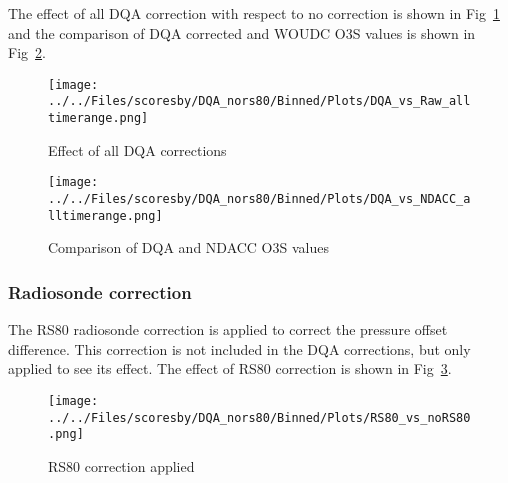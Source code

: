 %
The effect of all DQA correction with respect to no correction is shown in Fig~\ref{fig:dqa_all} and the comparison of DQA corrected and
WOUDC O3S values is shown in Fig~\ref{fig:fig_dqa_ndacc}.

                        \begin{figure}
        \centering
\texttt{[image: ../../Files/scoresby/DQA\_nors80/Binned/Plots/DQA\_vs\_Raw\_alltimerange.png]}
    \caption{Effect of all DQA corrections}
            \label{fig:dqa_all}
    \end{figure}
%
                        \begin{figure}
        \centering
\texttt{[image: ../../Files/scoresby/DQA\_nors80/Binned/Plots/DQA\_vs\_NDACC\_alltimerange.png]}
    \caption{Comparison of DQA and NDACC O3S values}
            \label{fig:fig_dqa_ndacc}
    \end{figure}
 \subsubsection{Radiosonde correction}
    The RS80 radiosonde correction is applied to correct the pressure offset difference.
    This correction is not included in the DQA corrections, but only applied to see its effect.
    The effect of RS80 correction is shown in Fig~\ref{fig:rs80}. \\

                        \begin{figure}
        \centering
\texttt{[image: ../../Files/scoresby/DQA\_nors80/Binned/Plots/RS80\_vs\_noRS80.png]}
    \caption{RS80 correction applied}
            \label{fig:rs80}
    \end{figure}
%
